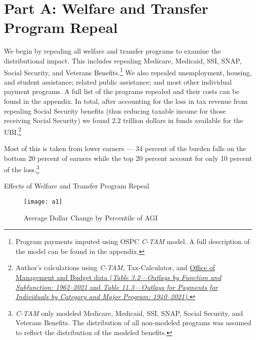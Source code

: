\documentclass{article}
\begin{document}
\section{Part A: Welfare and Transfer Program Repeal}
We begin by repealing all welfare and transfer programs to examine the distributional impact. This includes repealing Medicare, Medicaid, SSI, SNAP, Social Security, and Veterans Benefits.\footnote{Program payments imputed using OSPC \textit{C-TAM} model. A full description of the model can be found in the appendix.} We also repealed unemployment, housing, and student assistance; related public assistance; and most other individual payment programs. A full list of the programs repealed and their costs can be found in the appendix. In total, after accounting for the loss in tax revenue from repealing Social Security benefits (thus reducing taxable income for those receiving Social Security) we found $2.2$ trillion dollars in funds available for the UBI.\footnote{Author's calculations using \textit{C-TAM}, Tax-Calculator, and \href{https://obamawhitehouse.archives.gov/omb/budget/Historicals}{Office of Management and Budget data (\textit{Table 3.2—Outlays by Function and Subfunction: 1962–2021} and \textit{Table 11.3—Outlays for Payments for Individuals by Category and Major Program: 1940–2021).}}}

Most of this is taken from lower earners — 34 percent of the burden falls on the bottom 20 percent of earners while the top 20 percent account for only 10 percent of the loss.\footnote{\textit{C-TAM} only modeled Medicare, Medicaid, SSI, SNAP, Social Security, and Veterans Benefits. The distribution of all non-modeled programs was assumed to reflect the distribution of the modeled benefits.}

\begin{table}[H]
\caption{Effects of Welfare and Transfer Program Repeal}
\begin{center}
\begin{adjustbox}{max width=\textwidth}

\end{adjustbox}
\end{center}
\end{table}

\begin{figure}[H]
\begin{center}
\caption{Average Dollar Change by Percentile of AGI}
\texttt{[image: a1]}
\end{center}
\end{figure}
\end{document}
